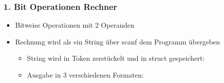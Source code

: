 \documentclass[a4paper,10pt,english]{report}
\begin{document}
\subsubsection{1. Bit Operationen Rechner}
\label{\detokenize{P03_Bit_Operation_struct_typedef/README:bit-operationen-rechner}}\begin{itemize}
\item {} 
\sphinxAtStartPar
Bitweise Operationen mit 2 Operanden

\item {} 
\sphinxAtStartPar
Rechnung wird als ein String über scanf dem Programm übergeben
\begin{itemize}
\item {} 
\sphinxAtStartPar
String wird in Token zerstückelt und in struct gespeichert:

\begin{sphinxVerbatim}[commandchars=\\\{\}]
  
    
    
   
 
\end{sphinxVerbatim}

\item {} 
\sphinxAtStartPar
Ausgabe in 3 verschiedenen Formaten:

\begin{sphinxVerbatim}[commandchars=\\\{\}]
 
  
      

      
\end{sphinxVerbatim}

\end{itemize}

\end{itemize}
\end{document}

